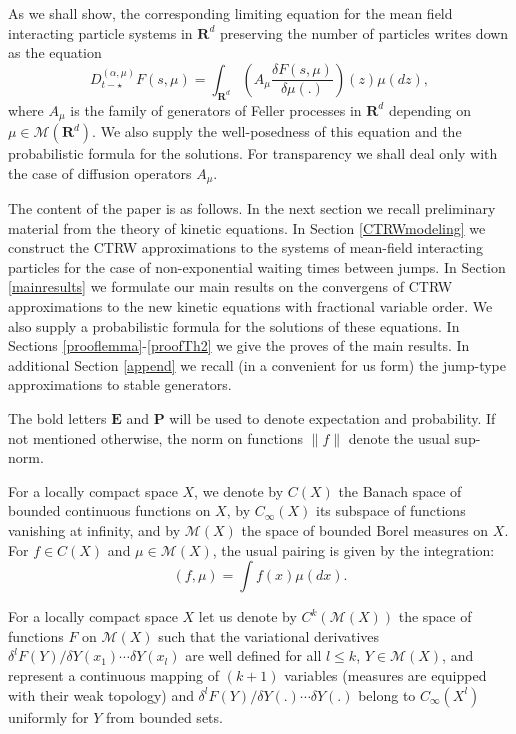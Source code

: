 \documentclass[12pt]{article}
\def\MC{\mathcal{M}}
\def\E{\mathbf{E}}
\def\P{\mathbf{P}}
\def\R{\mathbf{R}}
\def\al{\alpha}
\def\de{\delta}
\numberwithin{equation}{section}
\begin{document}
As we shall show, the corresponding limiting equation for the mean field interacting
particle systems in $\R^d$ preserving the number of particles writes down as the equation
\begin{equation}
\label{eqkinfufrac}
D_{t-\star}^{(\al,\mu)} F(s,\mu) =\int_{\R^d} \left(A_{\mu} \frac{\de F(s,\mu)}{\de \mu (.)}\right)(z) \mu(dz),
\end{equation}
where $A_{\mu}$ is the family of generators of Feller processes in $\R^d$ depending on $\mu\in \MC(\R^d)$.
We also supply the well-posedness of this equation and the probabilistic formula for the solutions.
For transparency we shall deal only with the case of diffusion operators $A_{\mu}$.



The content of the paper is as follows. In the next section we recall preliminary material from the theory of kinetic equations. In Section \ref{CTRWmodeling} we construct the CTRW approximations to the systems of mean-field interacting particles for the case of non-exponential waiting times between jumps. In Section \ref{mainresults} we formulate our main results on the convergens of  CTRW approximations to the new kinetic equations with fractional variable order. We also supply a probabilistic formula for the solutions of these equations. In Sections \ref{prooflemma}-\ref{proofTh2} we give the proves of the main results. In additional Section \ref{append} we recall (in a convenient for us form) the jump-type approximations to stable generators.


The bold letters $\E$ and $\P$ will be used to denote expectation and probability.
If not mentioned otherwise, the norm on functions $\|f\|$ denote the usual sup-norm.

For a locally compact space $X$, we denote by $C(X)$ the Banach space of bounded continuous functions
on $X$, by $C_{\infty}(X)$ its subspace of functions vanishing at infinity,
and by $\MC(X)$ the space of bounded Borel measures on $X$. For $f\in C(X)$ and $\mu\in \MC(X)$,
 the usual pairing is given by the integration:
 \[
 (f,\mu)=\int f(x) \mu (dx).
\]

For a locally compact space $X$ let us denote by $C^k(\MC(X))$  the space of functions
$F$ on $\MC(X)$ such that the variational derivatives
$\de^lF(Y)/ \de Y(x_1)\cdots \de Y(x_l)$ are well defined for all $l\le k$, $Y\in \MC(X)$,
and represent a continuous mapping of $(k+1)$ variables
(measures are equipped with their weak topology) and
$\de^lF(Y)/ \de Y(.)\cdots \de Y(.)$ belong to $C_{\infty}(X^l)$ uniformly for $Y$ from bounded sets.
\end{document}
